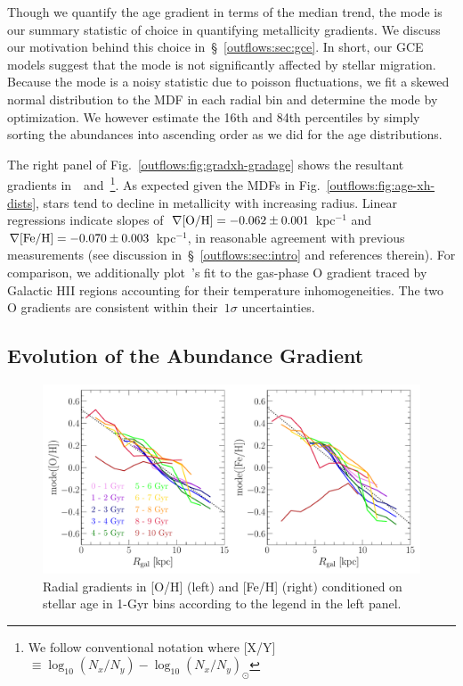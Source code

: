 Though we quantify the age gradient in terms of the median trend, the mode is
our summary statistic of choice in quantifying metallicity gradients.
We discuss our motivation behind this choice in~\S~\ref{outflows:sec:gce}.
In short, our GCE models suggest that the mode is not significantly affected
by stellar migration.
Because the mode is a noisy statistic due to poisson fluctuations, we fit a
skewed normal distribution to the MDF in each radial bin and determine the mode
by optimization.
We however estimate the 16th and 84th percentiles by simply sorting the
abundances into ascending order as we did for the age distributions.
\par
The right panel of Fig.~\ref{outflows:fig:gradxh-gradage} shows the resultant
gradients in~\oh~and~\feh\footnote{
	We follow conventional notation where
	[X/Y]~$\equiv \log_{10} (N_x / N_y) - \log_{10} (N_x / N_y)_\odot$
}.
As expected given the MDFs in Fig.~\ref{outflows:fig:age-xh-dists}, stars tend
to decline in metallicity with increasing radius.
Linear regressions indicate slopes of~$\nabla\text{[O/H]} = -0.062 \pm 0.001$ kpc$^{-1}$
and~$\nabla\text{[Fe/H]} = -0.070 \pm 0.003$ kpc$^{-1}$, in reasonable agreement with
previous measurements (see discussion in~\S~\ref{outflows:sec:intro} and
references therein).
For comparison, we additionally plot~\citeauthor{MendezDelgado2022}'s
\citeyearpar{MendezDelgado2022} fit to the gas-phase O gradient traced by
Galactic HII regions accounting for their temperature inhomogeneities.
The two O gradients are consistent within their~$1\sigma$ uncertainties.

\subsection{Evolution of the Abundance Gradient}
\label{outflows:sec:empirical:evolution}

\begin{figure}
\centering
\includegraphics[scale = 0.55]{gradxh_fixedage.pdf}
\caption{
Radial gradients in [O/H] (left) and [Fe/H] (right) conditioned on stellar age
in 1-Gyr bins according to the legend in the left panel.
}
\label{outflows:fig:gradxh-fixed-age}
\end{figure}

